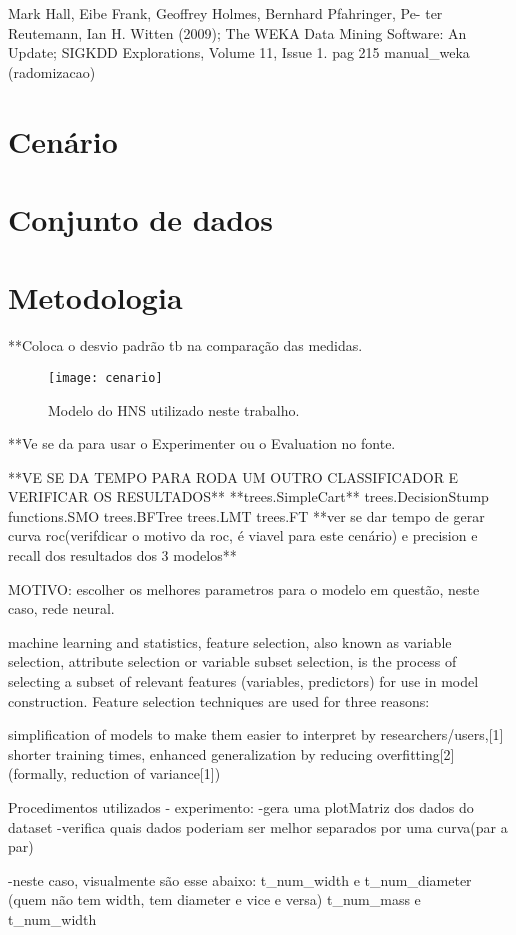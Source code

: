 Mark Hall, Eibe Frank, Geoffrey Holmes, Bernhard Pfahringer, Pe- ter Reutemann, Ian H. Witten (2009); The WEKA Data Mining Software: An Update; SIGKDD Explorations, Volume 11, Issue 1.
pag 215 manual_weka (radomizacao)
\section{Cenário}
\section{Conjunto de dados}
\label{sec:dataset}
\section{Metodologia}
**Coloca o desvio padrão tb na comparação das medidas.
\begin{figure}[!htb] \centering 
  \centering
  \texttt{[image: cenario]} 
  \caption{Modelo do HNS utilizado neste trabalho.} 
  \label{fig:hnsworkmodel}
\end{figure}

**Ve se da para usar o Experimenter ou o Evaluation no fonte.


**VE SE DA TEMPO PARA RODA UM OUTRO CLASSIFICADOR E VERIFICAR OS RESULTADOS**
**trees.SimpleCart**
trees.DecisionStump
functions.SMO
trees.BFTree
trees.LMT
trees.FT
**ver se dar tempo de gerar curva roc(verifdicar o motivo da roc, é viavel para este cenário) e precision e recall dos resultados dos 3 modelos**

MOTIVO:
escolher os melhores parametros para o modelo em questão, neste caso, rede neural.

 machine learning and statistics, feature selection, also known as variable selection, attribute selection or variable subset selection, is the process of selecting a subset of relevant features (variables, predictors) for use in model construction. Feature selection techniques are used for three reasons:

        simplification of models to make them easier to interpret by researchers/users,[1]
        shorter training times,
        enhanced generalization by reducing overfitting[2](formally, reduction of variance[1])



Procedimentos utilizados - experimento:
-gera uma plotMatriz dos dados do dataset
-verifica quais dados poderiam ser melhor separados por uma curva(par a par)

-neste caso, visualmente são esse abaixo:
t_num_width e t_num_diameter
(quem não tem width, tem diameter e vice e versa)
t_num_mass e t_num_width

